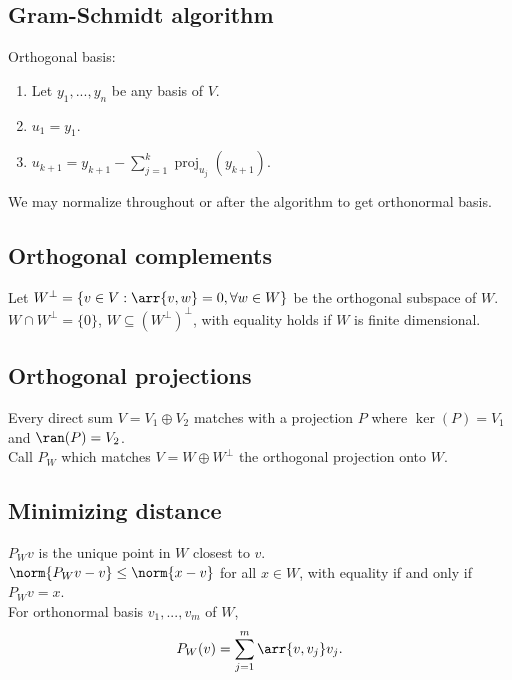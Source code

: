 \documentclass[10pt]{LatexTemplate/hw}
\begin{document}
\begin{multicols*}{2}
\subsection{Gram-Schmidt algorithm}
Orthogonal basis:
\begin{enumerate}
    \item Let $y_1,...,y_n$ be any basis of $V$.
    \item $u_1=y_1$.
    \item $u_{k+1}=y_{k+1}-\sum_{j=1}^k\operatorname{proj}_{u_j}(y_{k+1})$.
\end{enumerate}
We may normalize throughout or after the algorithm to get orthonormal basis.\\
\subsection{Orthogonal complements}
Let $W^\perp=\{v\in V:\arr{v,w}=0,\forall w\in W\}$ be the orthogonal subspace of $W$.\\
$W\cap W^\perp=\{0\}$, $W\subseteq (W^\perp)^\perp$, with equality holds if $W$ is finite dimensional.
\subsection{Orthogonal projections}
Every direct sum $V=V_1\oplus V_2$ matches with a projection $P$ where $\ker(P)=V_1$ and $\ran(P)=V_2$.\\
Call $P_W$ which matches $V=W\oplus W^\perp$ the orthogonal projection onto $W$.
\subsection{Minimizing distance}
$P_W v$ is the unique point in $W$ closest to $v$.\\
$\norm{P_W v-v}\le\norm{x-v}$ for all $x\in W$, with equality if and only if $P_W v=x$.\\
For orthonormal basis $v_1,...,v_m$ of $W$, $$P_W(v)=\sum_{j=1}^m\arr{v,v_j}v_j.$$


\end{multicols*}
\end{document}
